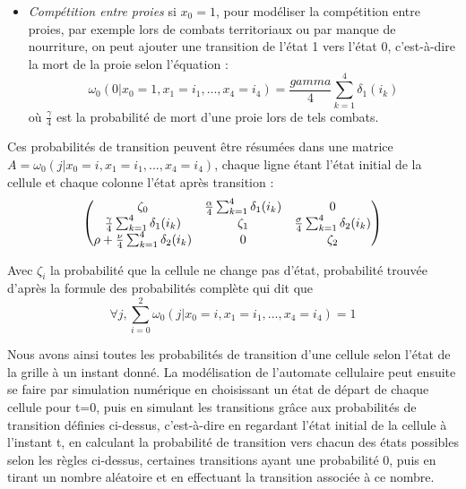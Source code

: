 \begin {itemize}
\vspace{0.3cm}
\item \textit{Compétition entre proies}  si $x_0=1$, pour modéliser la compétition entre proies, par exemple lors de combats territoriaux ou par manque de nourriture, on peut ajouter une transition de l'état 1 vers l'état 0, c'est-à-dire la mort de la proie selon l'équation : \begin{equation}\omega_0(0|x_0=1, x_1=i_1, ..., x_4=i_4)=\frac{gamma}{4}\sum_{k=1}^{4}\delta_{1}(i_k)\end{equation} où $\frac{\gamma}{4}$ est la probabilité de mort d'une proie lors de tels combats.

\end{itemize}
\vspace{0.3cm}
Ces probabilités de transition peuvent être résumées dans une matrice $A=\omega_0(j|x_0=i, x_1=i_1, ..., x_4=i_4)$, chaque ligne étant l'état initial de la cellule et chaque colonne l'état après transition : 
$$\begin{pmatrix}
\zeta_0 & \frac{\alpha}{4}\sum_{k=1}^{4}\delta_{1}(i_k)\end{equation} & 0 \\
\frac{\gamma}{4}\sum_{k=1}^{4}\delta_{1}(i_k) & \zeta_1 & \frac{\sigma}{4}\sum_{k=1}^{4}\delta_{2}(i_k) \\
\rho + \frac{\nu}{4}\sum_{k=1}^{4}\delta_{2}(i_k) & 0 & \zeta_2
\end{pmatrix}$$

Avec $\zeta_i$ la probabilité que la cellule ne change pas d'état, probabilité trouvée d'après la formule des probabilités complète qui dit que \begin{equation}
\forall j, \sum_{i=0}^2\omega_0(j|x_0=i, x_1=i_1, ..., x_4=i_4)=1\end{equation}

\vspace{0.3cm}
Nous avons ainsi toutes les probabilités de transition d'une cellule selon l'état de la grille à un instant donné. La modélisation de l'automate cellulaire peut ensuite se faire par simulation numérique en choisissant un état de départ de chaque cellule pour t=0, puis en simulant les transitions grâce aux probabilités de transition définies ci-dessus, c'est-à-dire en regardant l'état initial de la cellule à l'instant t, en calculant la probabilité de transition vers chacun des états possibles selon les règles ci-dessus, certaines transitions ayant une probabilité 0, puis en tirant un nombre aléatoire et en effectuant la transition associée à ce nombre. 
